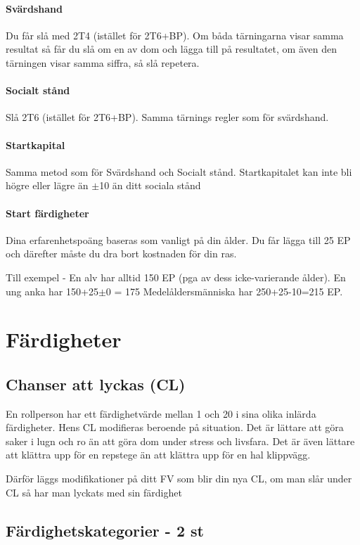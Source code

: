 \documentclass[a4paper, 10pt, titlepage]{article}
\begin{document}
\paragraph{Svärdshand} Du får slå med 2T4 (istället för 2T6+BP). Om båda tärningarna visar samma resultat
så får du slå om en av dom och lägga till på resultatet, om även den tärningen visar samma siffra, så
slå repetera.

\paragraph{Socialt stånd} Slå 2T6 (istället för 2T6+BP). Samma tärnings regler som för svärdshand.

\paragraph{Startkapital} Samma metod som för Svärdshand och Socialt stånd. Startkapitalet kan inte
bli högre eller lägre än $\pm$10 än ditt sociala stånd

\paragraph{Start färdigheter} Dina erfarenhetspoäng baseras som vanligt på din ålder. Du får
lägga till 25 EP och därefter måste du dra bort kostnaden för din ras.

Till exempel - En alv har alltid 150 EP (pga av dess icke-varierande ålder). En ung anka har 150+25$\pm$0 = 175
Medelåldersmänniska har 250+25-10=215 EP.

\section{Färdigheter}

\subsection{Chanser att lyckas (CL)}
En rollperson har ett färdighetvärde mellan 1 och 20 i sina olika inlärda färdigheter. Hens CL modifieras
beroende på situation. Det är lättare att göra saker i lugn och ro än att göra dom under stress och livsfara.
Det är även lättare att klättra upp för en repstege än att klättra upp för en hal klippvägg.

Därför läggs modifikationer på ditt FV som blir din nya CL, om man slår under CL så har man lyckats med
sin färdighet

\subsection{Färdighetskategorier - 2 st}
\end{document}
